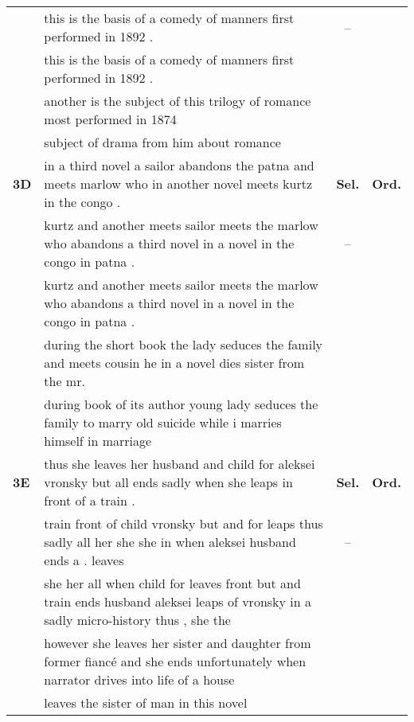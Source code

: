 \documentclass[class=article]{standalone}
\newcommand{\cmark}{\ding{51}}%
\newcommand{\xmark}{\ding{55}}%
\newcommand{\namark}{\ding{54}}
\newcommand{\passmark}{--}
\begin{document}
\begin{table*}
\begin{tabular}{ p{\collenone} p{\collentwo} C{\collenthree} C{\collenthree} }
			\textbf{\oracletitle}  & this is the basis of a comedy of manners first performed in 1892 . & \passmark & \cmark \\
			\textbf{\twosteptitle}  & this is the basis of a comedy of manners first performed in 1892 . & \cmark & \cmark \\
			\textbf{\iref}  & another is the subject of this trilogy of romance most performed in 1874 &  &  \\
			\textbf{\ip}  & subject of drama from him about romance  &  &  \\
			\hline
			\textbf{3D \hfill {}}  & in a third novel a sailor abandons the patna and meets marlow who in another novel meets kurtz in the congo . & \textbf{Sel.} & \textbf{Ord.} \\
			\textbf{\oracletitle}  & kurtz and another meets sailor meets the marlow who abandons a third novel in a novel in the congo in patna . & \passmark & \xmark \\
			\textbf{\twosteptitle}  & kurtz and another meets sailor meets the marlow who abandons a third novel in a novel in the congo in patna . & \cmark & \xmark \\
			\textbf{\iref}  & during the short book the lady seduces the family and meets cousin he in a novel dies sister from the mr. &  &  \\
			\textbf{\ip}  & during book of its author young lady seduces the family to marry old suicide while i marries himself in marriage &  &  \\
			\hline
			\textbf{3E \hfill {}}  & thus she leaves her husband and child for aleksei vronsky but all ends sadly when she leaps in front of a train . & \textbf{Sel.} & \textbf{Ord.} \\
			\textbf{\oracletitle}  & train front of child vronsky but and for leaps thus sadly all her she she in when aleksei husband ends a . leaves & \passmark & \namark \\
			\textbf{\twosteptitle}  & she her all when child for leaves front but and train ends husband aleksei leaps of vronsky in a sadly micro-history thus , she the & \xmark & \namark \\
			\textbf{\iref}  & however she leaves her sister and daughter from former fianc\'e and she ends unfortunately when narrator drives into life of a house &  &  \\
			\textbf{\ip}  & leaves the sister of man in this novel &  &  \\
		\end{tabular}
		

\end{table*}
\end{document}
